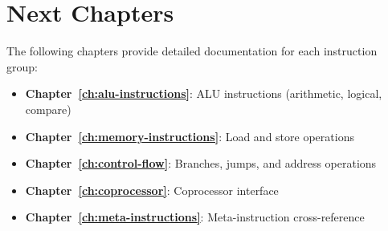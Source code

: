 \section{Next Chapters}

The following chapters provide detailed documentation for each instruction group:

\begin{itemize}
	\item \textbf{Chapter~\ref{ch:alu-instructions}}: ALU instructions (arithmetic, logical, compare)
	\item \textbf{Chapter~\ref{ch:memory-instructions}}: Load and store operations
	\item \textbf{Chapter~\ref{ch:control-flow}}: Branches, jumps, and address operations
	\item \textbf{Chapter~\ref{ch:coprocessor}}: Coprocessor interface
	\item \textbf{Chapter~\ref{ch:meta-instructions}}: Meta-instruction cross-reference
\end{itemize}

